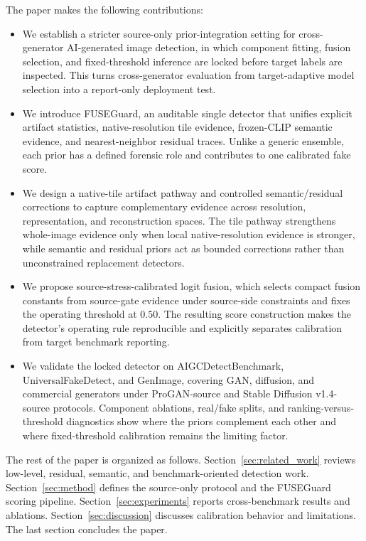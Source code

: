\documentclass[lettersize,journal]{IEEEtran}
\begin{document}
The paper makes the following contributions:
\begin{itemize}
    \item We establish a stricter source-only prior-integration setting for cross-generator AI-generated image detection, in which component fitting, fusion selection, and fixed-threshold inference are locked before target labels are inspected. This turns cross-generator evaluation from target-adaptive model selection into a report-only deployment test.
    \item We introduce FUSEGuard, an auditable single detector that unifies explicit artifact statistics, native-resolution tile evidence, frozen-CLIP semantic evidence, and nearest-neighbor residual traces. Unlike a generic ensemble, each prior has a defined forensic role and contributes to one calibrated fake score.
    \item We design a native-tile artifact pathway and controlled semantic/residual corrections to capture complementary evidence across resolution, representation, and reconstruction spaces. The tile pathway strengthens whole-image evidence only when local native-resolution evidence is stronger, while semantic and residual priors act as bounded corrections rather than unconstrained replacement detectors.
    \item We propose source-stress-calibrated logit fusion, which selects compact fusion constants from source-gate evidence under source-side constraints and fixes the operating threshold at $0.50$. The resulting score construction makes the detector's operating rule reproducible and explicitly separates calibration from target benchmark reporting.
    \item We validate the locked detector on AIGCDetectBenchmark, UniversalFakeDetect, and GenImage, covering GAN, diffusion, and commercial generators under ProGAN-source and Stable Diffusion v1.4-source protocols. Component ablations, real/fake splits, and ranking-versus-threshold diagnostics show where the priors complement each other and where fixed-threshold calibration remains the limiting factor.
\end{itemize}

The rest of the paper is organized as follows. Section~\ref{sec:related_work} reviews low-level, residual, semantic, and benchmark-oriented detection work. Section~\ref{sec:method} defines the source-only protocol and the FUSEGuard scoring pipeline. Section~\ref{sec:experiments} reports cross-benchmark results and ablations. Section~\ref{sec:discussion} discusses calibration behavior and limitations. The last section concludes the paper.
\end{document}
